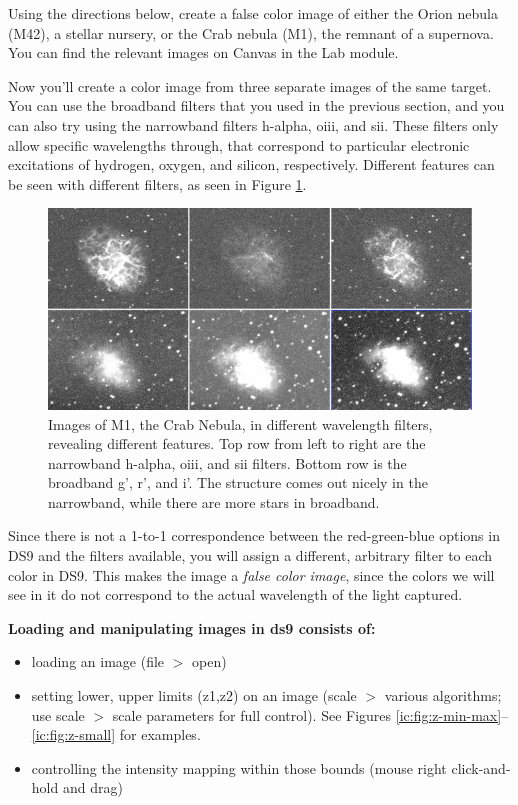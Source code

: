 \begin{steps}
	\item\label{ic:step:color-image} Using the directions below, create a false color image of either the Orion nebula (M42), a stellar nursery, or the Crab nebula (M1), the remnant of a supernova. You can find the relevant images on Canvas in the Lab module.
\end{steps}

Now you'll create a color image from three separate images of the same target. You can use the broadband filters that you used in the previous section, and you can also try using the narrowband filters h-alpha, oiii, and sii. These filters only allow specific wavelengths through, that correspond to particular electronic excitations of hydrogen, oxygen, and silicon, respectively. Different features can be seen with different filters, as seen in Figure \ref{ic:fig:m1-filters}.

\begin{figure}
	\centering
	\includegraphics[width=\textwidth]{inventing-color/m1-different-filters-lores.png}
	\caption{Images of M1, the Crab Nebula, in different wavelength filters, revealing different features. Top row from left to right are the narrowband h-alpha, oiii, and sii filters. Bottom row is the broadband g', r', and i'. The structure comes out nicely in the narrowband, while there are more stars in broadband.}\label{ic:fig:m1-filters}
\end{figure}

Since there is not a 1-to-1 correspondence between the red-green-blue options in DS9 and the filters available, you will assign a different, arbitrary filter to each color in DS9. This makes the image a \textit{false color image}, since the colors we will see in it do not correspond to the actual wavelength of the light captured.

\textbf{Loading and manipulating images in ds9 consists of:}
\begin{itemize}
\item loading an image  (file $>$ open)
\item setting lower, upper limits (z1,z2) on an image  (scale $>$ various algorithms; use scale $>$ scale parameters for full control). See Figures \ref{ic:fig:z-min-max}--\ref{ic:fig:z-small} for examples.
\item controlling the intensity mapping within those bounds (mouse right click-and-hold and drag)
\end{itemize}

